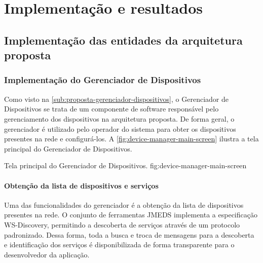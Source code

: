 \chapter{Implementação e resultados}





\section{Implementação das entidades da arquitetura proposta}



\subsection{Implementação do Gerenciador de Dispositivos}

Como visto na \cref{sub:proposta-gerenciador-dispositivos}, o Gerenciador de Dispositivos se trata
de um componente de software responsável pelo gerenciamento dos dispositivos na arquitetura
proposta. De forma geral, o gerenciador é utilizado pelo operador do sistema para obter os
dispositivos presentes na rede e configurá-los. A \cref{fig:device-manager-main-screen} ilustra a
tela principal do Gerenciador de Dispositivos.

  {Tela principal do Gerenciador de Dispositivos.}
  {fig:device-manager-main-screen}


\subsubsection{Obtenção da lista de dispositivos e serviços}

Uma das funcionalidades do gerenciador é a obtenção da lista de dispositivos presentes na rede. O
conjunto de ferramentas \gls{JMEDS} implementa a especificação {WS-Discovery}, permitindo a
descoberta de serviços através de um protocolo padronizado. Dessa forma, toda a busca e troca de
mensagens para a descoberta e identificação dos serviços é disponibilizada de forma transparente
para o desenvolvedor da aplicação.

